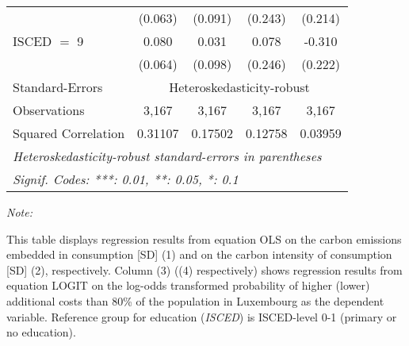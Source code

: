 \begin{table}[htbp!]
\begin{adjustbox}{width = 1\textwidth, max height = 0.95\textheight, center}
\begin{threeparttable}[b]
\begin{tabular}{lcccc}
                                 & (0.063)            & (0.091)            & (0.243)        & (0.214)\\   
            ISCED $=$ 9          & 0.080              & 0.031              & 0.078          & -0.310\\   
                                 & (0.064)            & (0.098)            & (0.246)        & (0.222)\\   
            \midrule 
            Standard-Errors & \multicolumn{4}{c}{Heteroskedasticity-robust} \\ 
            Observations         & 3,167              & 3,167              & 3,167          & 3,167\\  
            Squared Correlation  & 0.31107            & 0.17502            & 0.12758        & 0.03959\\  
            \midrule \midrule
            \multicolumn{5}{l}{\emph{Heteroskedasticity-robust standard-errors in parentheses}}\\
            \multicolumn{5}{l}{\emph{Signif. Codes: ***: 0.01, **: 0.05, *: 0.1}}\\
         \end{tabular}
         
         \begin{tablenotes}\item \medskip \textit{Note:}
            \item This table displays regression results from equation OLS on the carbon emissions embedded in consumption [SD] (1) and on the carbon intensity of consumption [SD] (2), respectively. 
                                      Column (3) ((4) respectively) shows regression results from equation LOGIT on the log-odds transformed probability of higher (lower) additional costs than 80\% of the population in Luxembourg as the dependent variable. Reference group for education (\textit{ISCED}) is ISCED-level 0-1 (primary or no education).
         \end{tablenotes}
      \end{threeparttable}
   \end{adjustbox}
\end{table}


